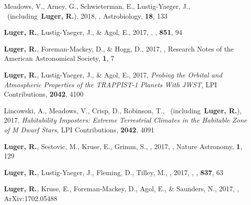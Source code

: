 \item[{\color{numcolor}\scriptsize---}] Meadows, V., Arney, G., Schwieterman, E., Lustig-Yaeger, J., \etal\ (including\ \textbf{Luger, R.}), 2018, , Astrobiology, \textbf{18}, 133

\item[{\color{numcolor}\scriptsize2}] \textbf{Luger, R.}, Lustig-Yaeger, J., \& Agol, E., 2017, , \apj, \textbf{851}, 94

\item[{\color{numcolor}\scriptsize---}] \textbf{Luger, R.}, Foreman-Mackey, D., \& Hogg, D., 2017, , Research Notes of the American Astronomical Society, \textbf{1}, 7

\item[{\color{numcolor}\scriptsize---}] \textbf{Luger, R.}, Lustig-Yaeger, J., \& Agol, E., 2017, \emph{Probing the Orbital and Atmospheric Properties of the TRAPPIST-1 Planets With JWST}, LPI Contributions, \textbf{2042}, 4100

\item[{\color{numcolor}\scriptsize---}] Lincowski, A., Meadows, V., Crisp, D., Robinson, T., \etal\ (including\ \textbf{Luger, R.}), 2017, \emph{Habitability Imposters: Extreme Terrestrial Climates in the Habitable Zone of M Dwarf Stars}, LPI Contributions, \textbf{2042}, 4091

\item[{\color{numcolor}\scriptsize38}] \textbf{Luger, R.}, Sestovic, M., Kruse, E., Grimm, S., \etal, 2017, , Nature Astronomy, \textbf{1}, 129

\item[{\color{numcolor}\scriptsize11}] \textbf{Luger, R.}, Lustig-Yaeger, J., Fleming, D., Tilley, M., \etal, 2017, , \apj, \textbf{837}, 63

\item[{\color{numcolor}\scriptsize15}] \textbf{Luger, R.}, Kruse, E., Foreman-Mackey, D., Agol, E., \& Saunders, N., 2017, , ArXiv:1702.05488

